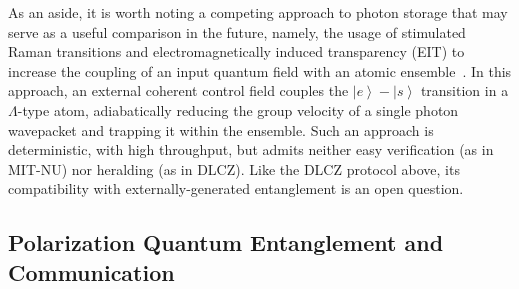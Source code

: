 \documentclass[aps,twocolumn,secnumarabic,amsmath,amssymb,pra,groupedaddress,
showpacs, showkeys,draft]{revtex4-1}
\newcommand{\ket}[1]{\left|#1\right\rangle}
\begin{document}
As an aside, it is worth noting a competing approach to photon storage that may
serve as a useful comparison in the future, namely, the usage of stimulated
Raman transitions and electromagnetically induced transparency (EIT) to
increase the coupling of an input quantum field with an atomic
ensemble~\cite{PhysRevA.65.022314,RevModPhys.75.457,PhysRevLett.98.123601,PhysRevA.76.033804}. In
this approach, an external coherent control field couples the $\ket{e}-\ket{s}$
transition in a $\Lambda$-type atom, adiabatically reducing the group velocity
of a single photon wavepacket and trapping it within the ensemble. Such an
approach is deterministic, with high throughput, but admits neither easy
verification (as in MIT-NU) nor heralding (as in DLCZ). Like the DLCZ protocol
above, its compatibility with externally-generated entanglement is an open
question.


\subsection{Polarization Quantum Entanglement and Communication\label{sec:intro:entanglement}}
\end{document}
